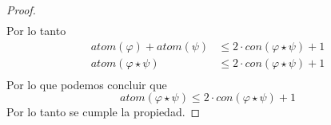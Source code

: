 \documentclass[a4paper]{article}
\begin{document}
\begin{proof}
\begin{align*}
    \end{align*}
    Por lo tanto
    \begin{align*}
        atom\left(\varphi\right) + atom\left(\psi\right) &\leq 2 \cdot con\left(\varphi \star \psi\right) + 1 \\
        atom\left(\varphi \star \psi\right) &\leq 2 \cdot con\left(\varphi \star \psi\right) + 1 \\
    \end{align*}
    Por lo que podemos concluir que
    \[
        atom\left(\varphi \star \psi\right) \leq 2 \cdot con\left(\varphi \star \psi\right) + 1
    \]
    Por lo tanto se cumple la propiedad.
\end{proof}
\end{document}
